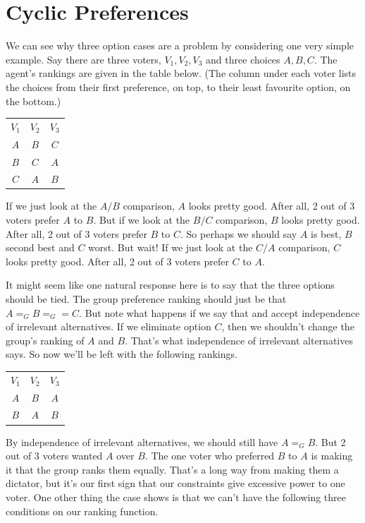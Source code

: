 \documentclass[openany]{book}
\begin{document}
\section{Cyclic Preferences}
We can see why three option cases are a problem by considering one very simple example. Say there are three voters, $V_1, V_2, V_3$ and three choices $A, B, C$. The agent's rankings are given in the table below. (The column under each voter lists the choices from their first preference, on top, to their least favourite option, on the bottom.)

\begin{center}
\begin{tabular}{c c c}
$V_1$ & $V_2$ & $V_3$ \\ 
$A$ & $B$ & $C$ \\
$B$ & $C$ & $A$ \\
$C$ & $A$ & $B$
\end{tabular}
\end{center}
If we just look at the $A/B$ comparison, $A$ looks pretty good. After all, 2 out of 3 voters prefer $A$ to $B$. But if we look at the $B/C$ comparison, $B$ looks pretty good. After all, 2 out of 3 voters prefer $B$ to $C$. So perhaps we should say $A$ is best, $B$ second best and $C$ worst. But wait! If we just look at the $C/A$ comparison, $C$ looks pretty good. After all, 2 out of 3 voters prefer $C$ to $A$.

It might seem like one natural response here is to say that the three options should be tied. The group preference ranking should just be that $A =_G B =_G = C$. But note what happens if we say that and accept independence of irrelevant alternatives. If we eliminate option $C$, then we shouldn't change the group's ranking of $A$ and $B$. That's what independence of irrelevant alternatives says. So now we'll be left with the following rankings.

\begin{center}
\begin{tabular}{c c c}
$V_1$ & $V_2$ & $V_3$ \\ 
$A$ & $B$ & $A$ \\
$B$ & $A$ & $B$ \\
\end{tabular}
\end{center}
By independence of irrelevant alternatives, we should still have $A =_G B$. But 2 out of 3 voters wanted $A$ over $B$. The one voter who preferred $B$ to $A$ is making it that the group ranks them equally. That's a long way from making them a dictator, but it's our first sign that our constraints give excessive power to one voter. One other thing the case shows is that we can't have the following three conditions on our ranking function.
\end{document}
